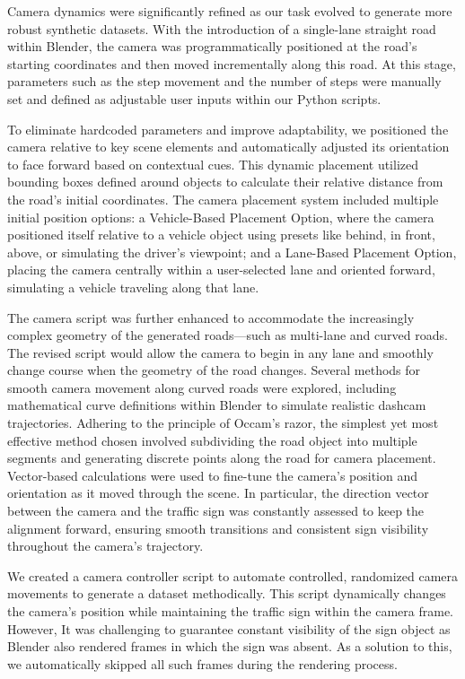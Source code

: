 \documentclass[journal]{IEEEtran}
\begin{document}
Camera dynamics were significantly refined as our task evolved to generate more robust synthetic datasets. With the introduction of a single-lane straight road within Blender, the camera was programmatically positioned at the road's starting coordinates and then moved incrementally along this road. At this stage, parameters such as the step movement and the number of steps were manually set and defined as adjustable user inputs within our Python scripts.

To eliminate hardcoded parameters and improve adaptability, we positioned the camera relative to key scene elements and automatically adjusted its orientation to face forward based on contextual cues. This dynamic placement utilized bounding boxes defined around objects to calculate their relative distance from the road's initial coordinates. The camera placement system included multiple initial position options: a Vehicle-Based Placement Option, where the camera positioned itself relative to a vehicle object using presets like behind, in front, above, or simulating the driver's viewpoint; and a Lane-Based Placement Option, placing the camera centrally within a user-selected lane and oriented forward, simulating a vehicle traveling along that lane.

The camera script was further enhanced to accommodate the increasingly complex geometry of the generated roads—such as multi-lane and curved roads. The revised script would allow the camera to begin in any lane and smoothly change course when the geometry of the road changes. Several methods for smooth camera movement along curved roads were explored, including mathematical curve definitions within Blender to simulate realistic dashcam trajectories. Adhering to the principle of Occam's razor, the simplest yet most effective method chosen involved subdividing the road object into multiple segments and generating discrete points along the road for camera placement. Vector-based calculations were used to fine-tune the camera's position and orientation as it moved through the scene. In particular, the direction vector between the camera and the traffic sign was constantly assessed to keep the alignment forward, ensuring smooth transitions and consistent sign visibility throughout the camera's trajectory.

We created a camera controller script to automate controlled, randomized camera movements to generate a dataset methodically. This script dynamically changes the camera's position while maintaining the traffic sign within the camera frame. However, It was challenging to guarantee constant visibility of the sign object as Blender also rendered frames in which the sign was absent. As a solution to this, we automatically skipped all such frames during the rendering process.
\end{document}
